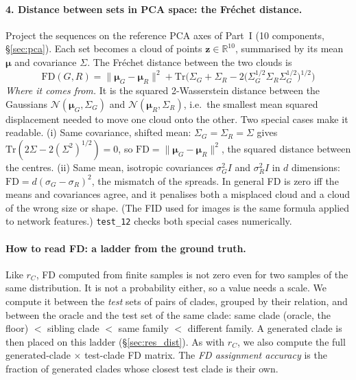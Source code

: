 \paragraph{4. Distance between sets in PCA space: the Fréchet distance.} Project the sequences on the reference
PCA axes of Part~I (10 components, \S\ref{sec:pca}). Each set becomes a cloud of points $\bm z\in\mathbb R^{10}$,
summarised by its mean $\bm\mu$ and covariance $\Sigma$. The Fréchet distance between the two clouds is
\begin{equation}\label{eq:frechet}
\boxed{\;\mathrm{FD}(G,R)=\|\bm\mu_G-\bm\mu_R\|^2+\mathrm{Tr}\Big(\Sigma_G+\Sigma_R-2\big(\Sigma_G^{1/2}\Sigma_R\Sigma_G^{1/2}\big)^{1/2}\Big)\;}
\end{equation}
\emph{Where it comes from.} It is the squared 2-Wasserstein distance between the Gaussians
$\mathcal N(\bm\mu_G,\Sigma_G)$ and $\mathcal N(\bm\mu_R,\Sigma_R)$, i.e.\ the smallest mean squared displacement
needed to move one cloud onto the other. Two special cases make it readable. (i) Same covariance, shifted mean:
$\Sigma_G=\Sigma_R=\Sigma$ gives $\mathrm{Tr}(2\Sigma-2(\Sigma^2)^{1/2})=0$, so $\mathrm{FD}=\|\bm\mu_G-\bm\mu_R\|^2$,
the squared distance between the centres. (ii) Same mean, isotropic covariances $\sigma_G^2I$ and $\sigma_R^2I$ in $d$
dimensions: $\mathrm{FD}=d(\sigma_G-\sigma_R)^2$, the mismatch of the spreads. In general FD is zero iff the means and
covariances agree, and it penalises both a misplaced cloud and a cloud of the wrong size or shape. (The FID used for
images is the same formula applied to network features.) \texttt{test\_12} checks both special cases numerically.

\paragraph{How to read FD: a ladder from the ground truth.} Like $r_C$, FD computed from finite samples is not
zero even for two samples of the same distribution. It is not a probability either, so a value needs a scale. We
compute it between the \emph{test} sets of pairs of clades, grouped by their relation, and between the oracle and
the test set of the same clade:
same clade (oracle, the floor) $<$ sibling clade $<$ same family $<$ different family. A generated clade is then
placed on this ladder (\S\ref{sec:res_dist}). As with $r_C$, we also compute the full generated-clade $\times$
test-clade FD matrix. The \emph{FD assignment accuracy} is the fraction of generated clades whose closest test
clade is their own.

